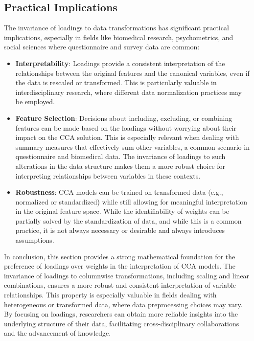 \subsection{Practical Implications}
The invariance of loadings to data transformations has significant practical implications, especially in fields like biomedical research, psychometrics, and social sciences where questionnaire and survey data are common:
\begin{itemize}
    \item \textbf{Interpretability}: Loadings provide a consistent interpretation of the relationships between the original features and the canonical variables, even if the data is rescaled or transformed. This is particularly valuable in interdisciplinary research, where different data normalization practices may be employed.
    \item \textbf{Feature Selection}: Decisions about including, excluding, or combining features can be made based on the loadings without worrying about their impact on the CCA solution. This is especially relevant when dealing with summary measures that effectively sum other variables, a common scenario in questionnaire and biomedical data. The invariance of loadings to such alterations in the data structure makes them a more robust choice for interpreting relationships between variables in these contexts.
    \item \textbf{Robustness}: CCA models can be trained on transformed data (e.g., normalized or standardized) while still allowing for meaningful interpretation in the original feature space. While the identifiability of weights can be partially solved by the standardization of data, and while this is a common practice, it is not always necessary or desirable and always introduces assumptions.
\end{itemize}

In conclusion, this section provides a strong mathematical foundation for the preference of loadings over weights in the interpretation of CCA models. The invariance of loadings to columnwise transformations, including scaling and linear combinations, ensures a more robust and consistent interpretation of variable relationships. This property is especially valuable in fields dealing with heterogeneous or transformed data, where data preprocessing choices may vary. By focusing on loadings, researchers can obtain more reliable insights into the underlying structure of their data, facilitating cross-disciplinary collaborations and the advancement of knowledge.


